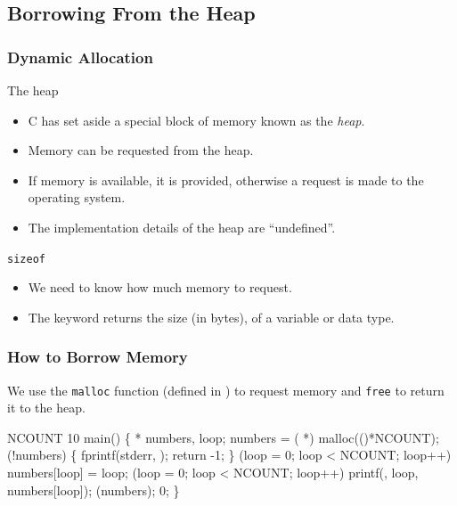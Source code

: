 \documentclass[smaller,handout,table]{beamer}
\begin{document}
\subsection{Borrowing From the Heap}
\begin{frame}
\frametitle{Dynamic Allocation}
\begin{block}{The heap}
\begin{itemize}
\item C has set aside a special block of memory known as the \emph{heap}.
\item Memory can be requested from the heap.
\item If memory is available, it is provided, otherwise a request is made to the operating system.
\item The implementation details of the heap are ``undefined''.
\end{itemize}
\end{block}
\begin{block}{\tt sizeof}
\begin{itemize}
\item We need to know how much memory to request.
\item The  keyword returns the size (in bytes), of a variable or data type.
\end{itemize}
\end{block}
\end{frame}

\begin{frame}[fragile]
\frametitle{How to Borrow Memory}
We use the {\tt malloc} function (defined in ) to request memory and {\tt free} to return it to the heap.
\vspace{-0.1in}
\begin{semiverbatim}
\scriptsize
\kr\kl{} 
\kl{} 
\kl{} NCOUNT 10
\kl{} main()
\kl\{
\kl   {} * numbers, loop;
\kl   numbers = ( *) malloc(()*NCOUNT);
\kl   {} (!numbers)
\kl   \{
\kl      fprintf(stderr, );
\kl      return -1;
\kl   \}
\kl   {} (loop = 0; loop < NCOUNT; loop++)
\kl      numbers[loop] = loop;
\kl
\kl   {} (loop = 0; loop < NCOUNT; loop++)
\kl      printf(, loop, numbers[loop]);
\kl
\kl   {}(numbers);
\kl   {} 0;
\kl\}
\end{semiverbatim}
\end{frame}
\end{document}

